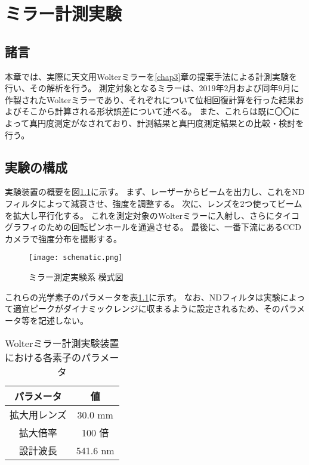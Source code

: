 \chapter{ミラー計測実験}
\thispagestyle{empty}
\label{chap5}
\graphicspath{{chap5/figure/}}
\minitoc

\newpage


\section{諸言}
\label{chap5_introduction}

本章では、実際に天文用Wolterミラーを\ref{chap3}章の提案手法による計測実験を行い、その解析を行う。
測定対象となるミラーは、2019年2月および同年9月に作製されたWolterミラーであり、それぞれについて位相回復計算を行った結果およびそこから計算される形状誤差について述べる。
また、これらは既に〇〇によって真円度測定がなされており、計測結果と真円度測定結果との比較・検討を行う。

\clearpage
\newpage

\section{実験の構成}

実験装置の概要を図\ref{fig:mirror_experiment_schematic}に示す。
まず、レーザーからビームを出力し、これをNDフィルタによって減衰させ、強度を調整する。
次に、レンズを2つ使ってビームを拡大し平行化する。
これを測定対象のWolterミラーに入射し、さらにタイコグラフィのための回転ピンホールを通過させる。
最後に、一番下流にあるCCDカメラで強度分布を撮影する。

\begin{figure}[!ht]
\centering
\texttt{[image: schematic.png]}
\caption{ミラー測定実験系 模式図}
\label{fig:mirror_experiment_schematic}
\end{figure}

これらの光学素子のパラメータを表\ref{tb:mirror_experiment_params}に示す。
なお、NDフィルタは実験によって適宜ピークがダイナミックレンジに収まるように設定されるため、そのパラメータ等を記述しない。

\begin{table}[h]
\begin{center}
  \begin{tabular}{|c|c|} \hline
    パラメータ & 値 \\ \hline
    拡大用レンズ & 30.0 mm  \\
    拡大倍率 & 100 倍 \\
    設計波長 & 541.6 nm \\ \hline
  \end{tabular}
  \caption{Wolterミラー計測実験装置における各素子のパラメータ}
  \label{tb:mirror_experiment_params}
\end{center}
\end{table}

